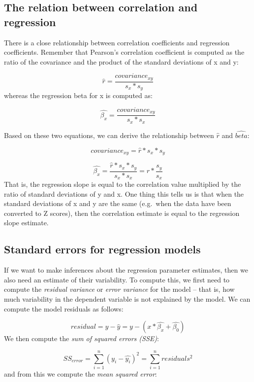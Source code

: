 \documentclass[12pt,]{book}
\theoremstyle{definition}
\theoremstyle{definition}
\theoremstyle{definition}
\theoremstyle{remark}
\begin{document}
\hypertarget{the-relation-between-correlation-and-regression}{%
\subsection{The relation between correlation and regression}\label{the-relation-between-correlation-and-regression}}

There is a close relationship between correlation coefficients and regression coefficients. Remember that Pearson's correlation coefficient is computed as the ratio of the covariance and the product of the standard deviations of x and y:

\[
\hat{r} = \frac{covariance_{xy}}{s_x * s_y}
\]
whereas the regression beta for x is computed as:

\[
\hat{\beta_x} = \frac{covariance_{xy}}{s_x*s_x}
\]

Based on these two equations, we can derive the relationship between \(\hat{r}\) and \(\hat{beta}\):

\[
covariance_{xy} = \hat{r} * s_x * s_y
\]

\[
\hat{\beta_x} =  \frac{\hat{r} * s_x * s_y}{s_x * s_x} = r * \frac{s_y}{s_x}
\]
That is, the regression slope is equal to the correlation value multiplied by the ratio of standard deviations of y and x. One thing this tells us is that when the standard deviations of x and y are the same (e.g.~when the data have been converted to Z scores), then the correlation estimate is equal to the regression slope estimate.

\hypertarget{standard-errors-for-regression-models}{%
\subsection{Standard errors for regression models}\label{standard-errors-for-regression-models}}

If we want to make inferences about the regression parameter estimates, then we also need an estimate of their variability. To compute this, we first need to compute the \emph{residual variance} or \emph{error variance} for the model -- that is, how much variability in the dependent variable is not explained by the model. We can compute the model residuals as follows:

\[
residual = y - \hat{y} = y - (x*\hat{\beta_x} + \hat{\beta_0})
\]
We then compute the \emph{sum of squared errors (SSE)}:

\[
SS_{error} = \sum_{i=1}^n{(y_i - \hat{y_i})^2} = \sum_{i=1}^n{residuals^2}
\]
and from this we compute the \emph{mean squared error}:
\end{document}

